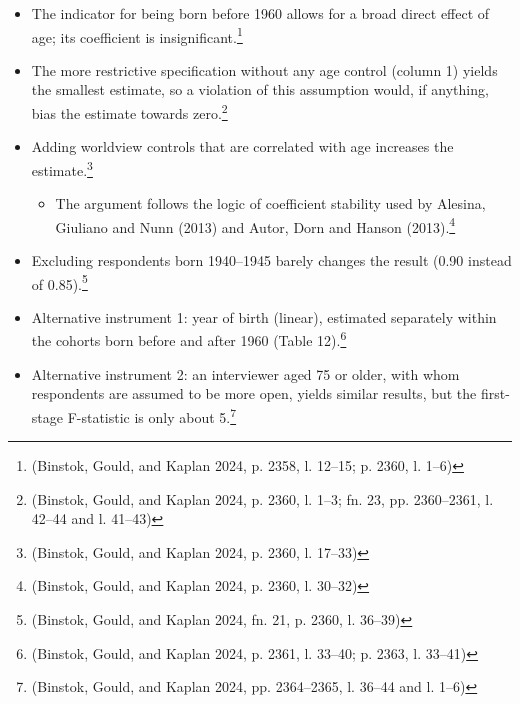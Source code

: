 \begin{itemize}
\item
  The indicator for being born before 1960 allows for a broad direct effect of age; its coefficient is insignificant.\footnote{(Binstok, Gould, and Kaplan 2024, p. 2358, l. 12--15; p. 2360, l. 1--6)}
\item
  The more restrictive specification without any age control (column 1) yields the smallest estimate, so a violation of this assumption would, if anything, bias the estimate towards zero.\footnote{(Binstok, Gould, and Kaplan 2024, p. 2360, l. 1--3; fn. 23, pp. 2360--2361, l. 42--44 and l. 41--43)}
\item
  Adding worldview controls that are correlated with age increases the estimate.\footnote{(Binstok, Gould, and Kaplan 2024, p. 2360, l. 17--33)}

  \begin{itemize}
  \item
    The argument follows the logic of coefficient stability used by Alesina, Giuliano and Nunn (2013) and Autor, Dorn and Hanson (2013).\footnote{(Binstok, Gould, and Kaplan 2024, p. 2360, l. 30--32)}
  \end{itemize}
\item
  Excluding respondents born 1940--1945 barely changes the result (0.90 instead of 0.85).\footnote{(Binstok, Gould, and Kaplan 2024, fn. 21, p. 2360, l. 36--39)}
\item
  Alternative instrument 1: year of birth (linear), estimated separately within the cohorts born before and after 1960 (Table 12).\footnote{(Binstok, Gould, and Kaplan 2024, p. 2361, l. 33--40; p. 2363, l. 33--41)}
\item
  Alternative instrument 2: an interviewer aged 75 or older, with whom respondents are assumed to be more open, yields similar results, but the first-stage F-statistic is only about 5.\footnote{(Binstok, Gould, and Kaplan 2024, pp. 2364--2365, l. 36--44 and l. 1--6)}
\end{itemize}

